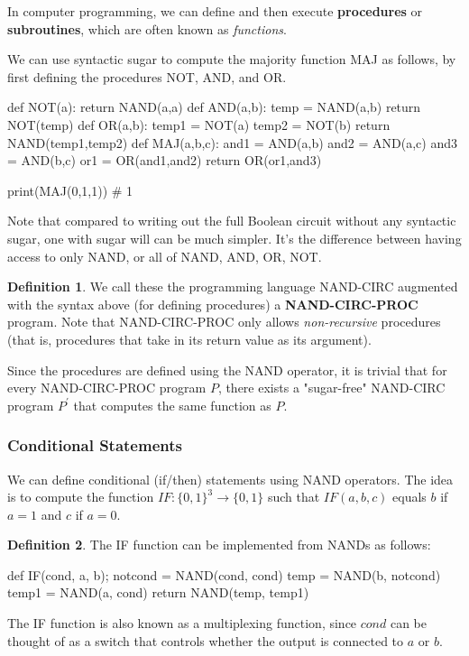 \documentclass[a4paper, 12pt]{report}
\theoremstyle{remark}
\theoremstyle{definition}
\newtheorem{definition}{Definition}[section]
\begin{document}
In computer programming, we can define and then execute \textbf{procedures} or \textbf{subroutines}, which are often known as \textit{functions}. 

\begin{example}
We can use syntactic sugar to compute the majority function MAJ as follows, by first defining the procedures NOT, AND, and OR. 
\begin{python}
def NOT(a):
return NAND(a,a)
def AND(a,b):
temp = NAND(a,b) return NOT(temp)
def OR(a,b):
temp1 = NOT(a)
    temp2 = NOT(b)
    return NAND(temp1,temp2)
    def MAJ(a,b,c): and1 = AND(a,b)
    and2 = AND(a,c) and3 = AND(b,c)
    or1 = OR(and1,and2) return OR(or1,and3)

print(MAJ(0,1,1))
# 1
\end{python}
\end{example}

Note that compared to writing out the full Boolean circuit without any syntactic sugar, one with sugar will can be much simpler. It's the difference between having access to only NAND, or all of NAND, AND, OR, NOT. 

\begin{definition}
We call these the programming language NAND-CIRC augmented with the syntax above (for defining procedures) a \textbf{NAND-CIRC-PROC} program. Note that NAND-CIRC-PROC only allows \textit{non-recursive} procedures (that is, procedures that take in its return value as its argument). 
\end{definition}

Since the procedures are defined using the NAND operator, it is trivial that for every NAND-CIRC-PROC program $P$, there exists a "sugar-free" NAND-CIRC program $P^\prime$ that computes the same function as $P$. 

\subsubsection{Conditional Statements}
We can define conditional (if/then) statements using NAND operators. The idea is to compute the function $IF: \{0,1\}^3 \longrightarrow \{0,1\}$ such that $IF(a, b, c)$ equals $b$ if $a = 1$ and $c$ if $a = 0$. 

\begin{definition}
The IF function can be implemented from NANDs as follows: 
\begin{python}
def IF(cond, a, b);
    notcond = NAND(cond, cond) 
    temp = NAND(b, notcond)
    temp1 = NAND(a, cond)
    return NAND(temp, temp1)
\end{python}
The IF function is also known as a multiplexing function, since $cond$ can be thought of as a switch that controls whether the output is connected to $a$ or $b$. 
\end{definition}
\end{document}
